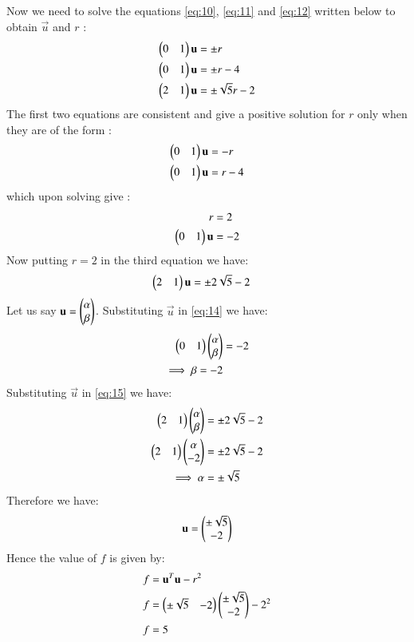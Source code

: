 \documentclass[journal,12pt,twocolumn]{IEEEtran}
\begin{document}
Now we need to solve the equations \eqref{eq:10}, \eqref{eq:11} and \eqref{eq:12} written below to obtain $\vec{u}$ and $r$ :
\begin{align}
\begin{pmatrix}0 & 1\end{pmatrix}\mathbf{u} &= \pm{r}\nonumber\\
\begin{pmatrix}0 & 1\end{pmatrix}\mathbf{u} &= \pm{r}-4\nonumber\\
\begin{pmatrix}2 & 1\end{pmatrix}\mathbf{u} &= \pm\sqrt{5}r-2\nonumber
\end{align}
The first two equations are consistent and give a positive solution for $r$ only when they are of the form :
\begin{align}
\begin{pmatrix}0 & 1\end{pmatrix}\mathbf{u} &= -r\nonumber\\
\begin{pmatrix}0 & 1\end{pmatrix}\mathbf{u} &= r-4\nonumber
\end{align}
which upon solving give :
\begin{align}
r &= 2\label{eq:13}\\
\begin{pmatrix}0 & 1\end{pmatrix}\mathbf{u} &= -2\label{eq:14}
\end{align}
Now putting $r=2$ in the third equation we have:
\begin{align}
\begin{pmatrix}2 & 1\end{pmatrix}\mathbf{u} &= \pm2\sqrt{5}-2\label{eq:15}
\end{align}
Let us say $\mathbf{u} = \begin{pmatrix}\alpha \\ \beta\end{pmatrix}$. Substituting $\vec{u}$ in \eqref{eq:14} we have:
\begin{align}
\begin{pmatrix}0 & 1\end{pmatrix}\begin{pmatrix}\alpha \\ \beta\end{pmatrix} &= -2\\
\implies \beta = -2
\end{align}
Substituting $\vec{u}$ in \eqref{eq:15} we have:
\begin{align}
\begin{pmatrix}2 & 1\end{pmatrix}\begin{pmatrix}\alpha \\ \beta\end{pmatrix} &= \pm2\sqrt{5} -2\\
\begin{pmatrix}2 & 1\end{pmatrix}\begin{pmatrix}\alpha \\ -2\end{pmatrix} &= \pm2\sqrt{5} -2\\
\implies \alpha &= \pm\sqrt{5}
\end{align}
Therefore we have:
\begin{align}
\mathbf{u} = \begin{pmatrix}\pm\sqrt{5} \\ -2\end{pmatrix}
\end{align}
Hence the value of $f$ is given by:
\begin{align}
f &=\mathbf{u}^T\mathbf{u}-r^2\\
f &= \begin{pmatrix}\pm\sqrt{5} & -2\end{pmatrix}\begin{pmatrix}\pm\sqrt{5} \\ -2\end{pmatrix} - 2^2\\
f &= 5
\end{align}
\end{document}
